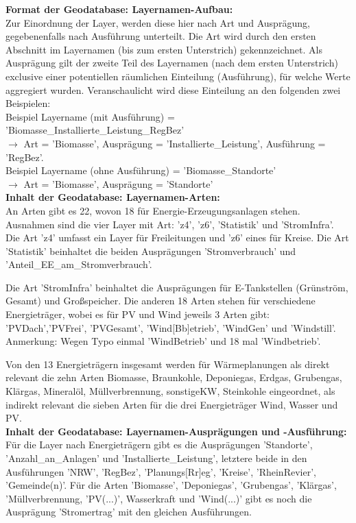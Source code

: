 			\textbf{Format der Geodatabase: Layernamen-Aufbau:}\\
			Zur Einordnung der Layer, werden diese hier nach Art und Ausprägung, gegebenenfalls nach Ausführung unterteilt. Die Art wird durch den ersten Abschnitt im Layernamen (bis zum ersten Unterstrich) gekennzeichnet. Als Ausprägung gilt der zweite Teil des Layernamen (nach dem ersten Unterstrich) exclusive einer potentiellen räumlichen Einteilung (Ausführung), für welche Werte aggregiert wurden. Veranschaulicht wird diese Einteilung an den folgenden zwei Beispielen:\\
			
			Beispiel Layername (mit Ausführung) = 'Biomasse\_Installierte\_Leistung\_RegBez' \\
			$\rightarrow$ Art = 'Biomasse', Ausprägung = 'Installierte\_Leistung', Ausführung = 'RegBez'. \\
			
			Beispiel Layername (ohne Ausführung) = 'Biomasse\_Standorte'\\
			$\rightarrow$ Art = 'Biomasse', Ausprägung = 'Standorte'\\
			
			\textbf{Inhalt der Geodatabase: Layernamen-Arten:}\\
			An Arten gibt es 22, wovon 18 für Energie-Erzeugungsanlagen stehen. Ausnahmen sind die vier Layer mit Art: 'z4', 'z6', 'Statistik' und 'StromInfra'. Die Art 'z4' umfasst ein Layer für Freileitungen und 'z6' eines für Kreise. Die Art 'Statistik' beinhaltet die beiden Ausprägungen 'Stromverbrauch' und 'Anteil\_EE\_am\_Stromverbrauch'. 
			
			Die Art 'StromInfra' beinhaltet die Ausprägungen für E-Tankstellen (Grünström, Gesamt) und Großspeicher. Die anderen 18 Arten stehen für verschiedene Energieträger, wobei es für PV und Wind jeweils 3 Arten gibt: 'PVDach','PVFrei', 'PVGesamt', 'Wind$[$Bb$]$etrieb', 'WindGen' und 'Windstill'. Anmerkung: Wegen Typo einmal 'WindBetrieb' und 18 mal 'Windbetrieb'.
			
			Von den 13 Energieträgern insgesamt werden für Wärmeplanungen als direkt relevant die zehn Arten Biomasse, Braunkohle, Deponiegas, Erdgas, Grubengas, Klärgas, Mineralöl, Müllverbrennung, sonstigeKW, Steinkohle eingeordnet, als indirekt relevant die sieben Arten für die drei Energieträger Wind, Wasser und PV. \\
			
			\textbf{Inhalt der Geodatabase: Layernamen-Ausprägungen und -Ausführung:}\\
			Für die Layer nach Energieträgern gibt es die Ausprägungen 'Standorte', 'Anzahl\_an\_Anlagen' und 'Installierte\_Leistung', letztere beide in den Ausführungen 'NRW', 'RegBez', 'Planungs$[$Rr$]$eg', 'Kreise', 'RheinRevier', 'Gemeinde(n)'. Für die Arten 'Biomasse', 'Deponiegas', 'Grubengas', 'Klärgas', 'Müllverbrennung, 'PV(...)', Wasserkraft und 'Wind(...)' gibt es noch die Ausprägung 'Stromertrag' mit den gleichen Ausführungen.\\
					
